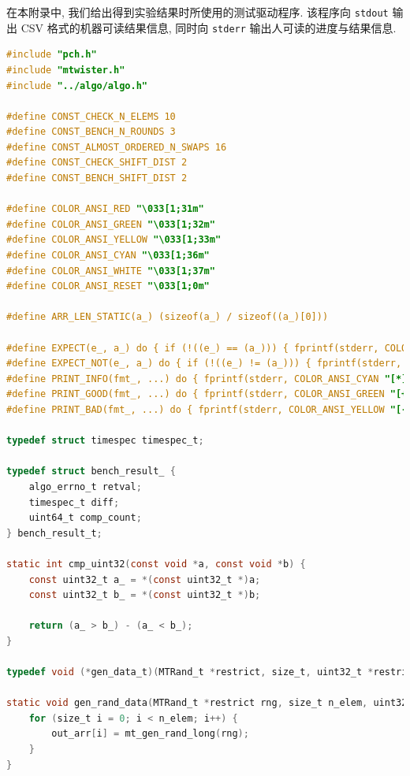 \documentclass[12pt]{article}
\begin{document}
在本附录中, 我们给出得到实验结果时所使用的测试驱动程序. 该程序向 \texttt{stdout} 输出 CSV 格式的机器可读结果信息, 同时向 \texttt{stderr} 输出人可读的进度与结果信息.

\begin{lstlisting}[language=C]
#include "pch.h"
#include "mtwister.h"
#include "../algo/algo.h"

#define CONST_CHECK_N_ELEMS 10
#define CONST_BENCH_N_ROUNDS 3
#define CONST_ALMOST_ORDERED_N_SWAPS 16
#define CONST_CHECK_SHIFT_DIST 2
#define CONST_BENCH_SHIFT_DIST 2

#define COLOR_ANSI_RED "\033[1;31m"
#define COLOR_ANSI_GREEN "\033[1;32m"
#define COLOR_ANSI_YELLOW "\033[1;33m"
#define COLOR_ANSI_CYAN "\033[1;36m"
#define COLOR_ANSI_WHITE "\033[1;37m"
#define COLOR_ANSI_RESET "\033[1;0m"

#define ARR_LEN_STATIC(a_) (sizeof(a_) / sizeof((a_)[0]))

#define EXPECT(e_, a_) do { if (!((e_) == (a_))) { fprintf(stderr, COLOR_ANSI_RED "[!]" COLOR_ANSI_RESET " " __FUNCTION__ "():%d: Assertion (" #a_ " == " #e_ ") failed", __LINE__); abort(); } } while (0)
#define EXPECT_NOT(e_, a_) do { if (!((e_) != (a_))) { fprintf(stderr, COLOR_ANSI_RED "[!]" COLOR_ANSI_RESET " " __FUNCTION__ "():%d: Assertion (" #a_ " != " #e_ ") failed", __LINE__); abort(); } } while (0)
#define PRINT_INFO(fmt_, ...) do { fprintf(stderr, COLOR_ANSI_CYAN "[*]" COLOR_ANSI_RESET " " __FUNCTION__ "():%d: " fmt_, __LINE__, ##__VA_ARGS__); } while (0)
#define PRINT_GOOD(fmt_, ...) do { fprintf(stderr, COLOR_ANSI_GREEN "[+]" COLOR_ANSI_RESET " " __FUNCTION__ "():%d: " fmt_, __LINE__, ##__VA_ARGS__); } while (0)
#define PRINT_BAD(fmt_, ...) do { fprintf(stderr, COLOR_ANSI_YELLOW "[-]" COLOR_ANSI_RESET " " __FUNCTION__ "():%d: " fmt_, __LINE__, ##__VA_ARGS__); } while (0)

typedef struct timespec timespec_t;

typedef struct bench_result_ {
    algo_errno_t retval;
    timespec_t diff;
    uint64_t comp_count;
} bench_result_t;

static int cmp_uint32(const void *a, const void *b) {
    const uint32_t a_ = *(const uint32_t *)a;
    const uint32_t b_ = *(const uint32_t *)b;

    return (a_ > b_) - (a_ < b_);
}

typedef void (*gen_data_t)(MTRand_t *restrict, size_t, uint32_t *restrict);

static void gen_rand_data(MTRand_t *restrict rng, size_t n_elem, uint32_t *restrict out_arr) {
    for (size_t i = 0; i < n_elem; i++) {
        out_arr[i] = mt_gen_rand_long(rng);
    }
}


\end{lstlisting}
\end{document}
